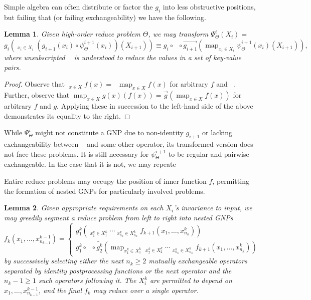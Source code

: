 \documentclass{article}
\newtheorem{lemma}{Lemma}
\newcommand{\OpSym}{\mathrm{O\!p}}
\newcommand{\opsym}{{\scriptstyle \mathrm{o\!p}}}
\newcommand{\OpCurry}[3][]{\mathop{\OpSym^{#1}_{#2}{#3}}}
\newcommand{\opcurry}[3][]{\mathop{\opsym^{#1}_{#2}{#3}}}
\newcommand{\Op}[2][]{\OpCurry[#1]{#2}{}}
\newcommand{\op}[2][]{\opcurry[#1]{#2}{}}
\newcommand{\comp}{\mathop{\circ}\nolimits}
\newcommand{\GNP}{\psi_{\Theta}}
\DeclareMathOperator*{\map}{map}
\begin{document}
Simple algebra can often distribute or factor the $g_i$ into
less obstructive positions, but failing that (or failing
exchangeability) we have the following.
\begin{lemma}
  Given high-order reduce problem $\Theta$, we may transform
  $\Psi_{\Theta}^i(X_i) =$
  \[
  g_i \left( \Op{i}_{x_i \in X_i} \left( g_{i+1}{\scriptstyle (x_i)} \comp \GNP^{i+1}{\scriptstyle (x_i)} \right) (X_{i+1}) \right) \equiv g_i \comp \Op{i} \comp \overrightarrow{g_{i+1}} \left( \map_{x_i \in X_i} \GNP^{i+1}{\scriptstyle (x_i)}(X_{i+1}) \right) ,
  \]
  where unsubscripted $\Op{i}$ is understood to reduce the values in a
  set of key-value pairs.
\end{lemma}
\begin{proof}
  Observe that $\Op{}_{x \in X} f(x) = \Op{} \map_{x \in X} f(x)$ for
  arbitrary $f$ and $\Op{}$.  Further, observe that $\map_{x \in X}
  g{\scriptstyle (x)}(f(x)) = \overrightarrow{g} \left( \map_{x \in X}
  f(x) \right)$ for arbitrary $f$ and $g$.  Applying these in
  succession to the left-hand side of the above demonstrates its
  equality to the right.
\end{proof}
\noindent While $\Psi_{\Theta}^i$ might not constitute a GNP due to
non-identity $g_{i+1}$ or lacking exchangeability between $\op{i}$ and
some other operator, its transformed version does not face these
problems.  It is still necessary for $\GNP^{i+1}$ to be regular and
pairwise exchangeable.  In the case that it is not, we may repeate 

Entire reduce problems may occupy the position of inner function $f$,
permitting the formation of nested GNPs for particularly involved
problems.
\begin{lemma}
  Given appropriate requirements on each $X_i$'s invariance to input,
  we may greedily segment a reduce problem from left to right into
  nested GNPs
  \[
  f_k(x_1,\ldots,x^{k-1}_{n_{k-1}}) = \left\{ \begin{array}{l}
      \displaystyle g^k_1 \left( \Op[k]{1}_{x^k_1 \in X^k_1}\cdots\Op[k]{n_k}_{x^k_{n_k} \in X^k_{n_k}} f_{k+1}(x_1,\ldots,x^k_{n_k}) \right) \\
      \displaystyle g^k_1 \comp \Op[k]{1} \comp \widetilde{g^k_2} \left( \map_{x^k_1 \in X^k_1} \Op[k]{2}_{x^k_2 \in X^k_2}\cdots\Op[k]{n_k}_{x^k_{n_k} \in X^k_{n_k}} f_{k+1}(x_1,\ldots,x^k_{n_k}) \right)
    \end{array} \right.
  \]
  by successively selecting either the next $n_k \geq 2$ mutually
  exchangeable operators separated by identity postprocessing
  functions or the next operator and the $n_k - 1 \geq 1$ such
  operators following it.  The $X^k_i$ are permitted to depend on
  $x_1,\ldots,x^{k-1}_{n_{k-1}}$, and the final $f_k$ may reduce over
  a single operator.
\end{lemma}
\end{document}
